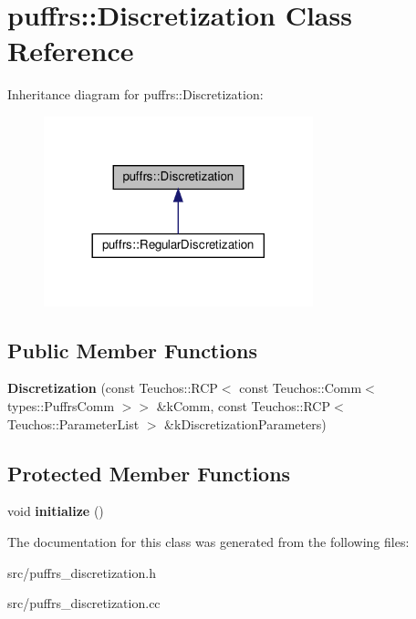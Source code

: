 \hypertarget{classpuffrs_1_1Discretization}{}\section{puffrs\+:\+:Discretization Class Reference}
\label{classpuffrs_1_1Discretization}


Inheritance diagram for puffrs\+:\+:Discretization\+:\nopagebreak
\begin{figure}[H]
\begin{center}
\leavevmode
\includegraphics[width=221pt]{classpuffrs_1_1Discretization__inherit__graph}
\end{center}
\end{figure}
\subsection*{Public Member Functions}
\begin{DoxyCompactItemize}
\item 
\mbox{\label{classpuffrs_1_1Discretization_a4da185868d21559de4d7a595d9a90bcf}} 
{\bfseries Discretization} (const Teuchos\+::\+R\+CP$<$ const Teuchos\+::\+Comm$<$ types\+::\+Puffrs\+Comm $>$$>$ \&k\+Comm, const Teuchos\+::\+R\+CP$<$ Teuchos\+::\+Parameter\+List $>$ \&k\+Discretization\+Parameters)
\end{DoxyCompactItemize}
\subsection*{Protected Member Functions}
\begin{DoxyCompactItemize}
\item 
\mbox{\label{classpuffrs_1_1Discretization_ac349695d441491e509fb7cb772ae9891}} 
void {\bfseries initialize} ()
\end{DoxyCompactItemize}


The documentation for this class was generated from the following files\+:\begin{DoxyCompactItemize}
\item 
src/puffrs\+\_\+discretization.\+h\item 
src/puffrs\+\_\+discretization.\+cc\end{DoxyCompactItemize}
